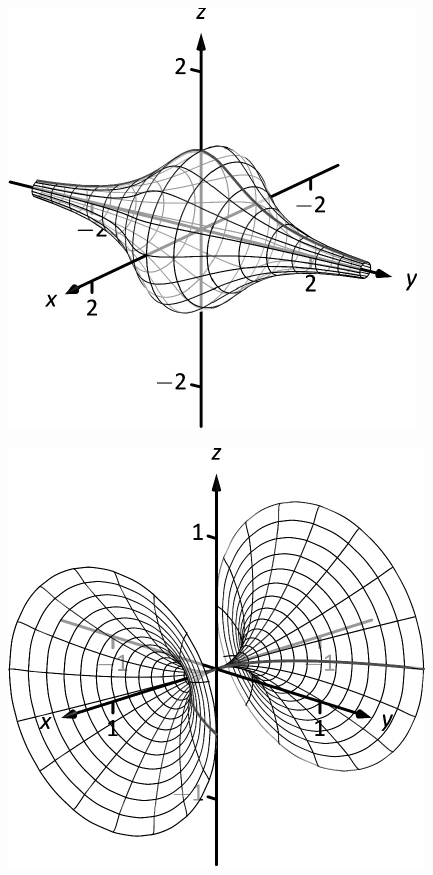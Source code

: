 \documentclass[10pt]{article}
\begin{document}
\includegraphics{fig10_01_ex_29_3DBW.pdf}
\texttt{}

\includegraphics{fig10_01_ex_30_3DBW.pdf}
\texttt{}
\end{document}

